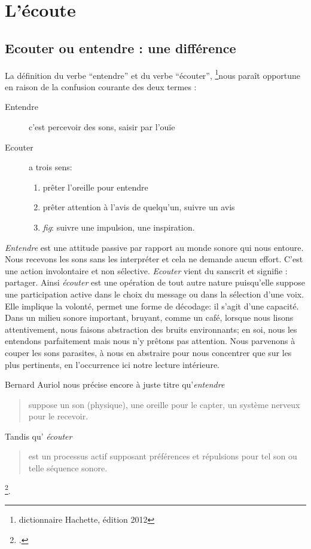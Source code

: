 \chapter{L'écoute}

\section{Ecouter ou entendre : une différence}

La définition du verbe ``entendre'' et du verbe ``écouter'', 
\footnote{dictionnaire Hachette, édition 2012 }nous paraît opportune %
en raison de la confusion courante des deux termes :
\begin{description}
\item[Entendre] c'est  percevoir des sons, saisir par l'ouïe
\item[Ecouter] a trois sens: 
\begin{enumerate}
	\item prêter l'oreille pour entendre
	\item prêter attention
	à l'avis de quelqu'un, suivre un avis
	\item \emph{fig}: suivre une impulsion,
	une inspiration.
\end{enumerate}
\end{description}



\emph{Entendre} est une attitude passive par rapport au monde sonore
qui nous entoure. Nous recevons les sons sans les interpréter et cela
ne demande aucun effort. C'est une action involontaire et non
sélective.
\textit{Ecouter} vient du sanscrit et signifie : partager.
Ainsi \emph{écouter} est une opération de tout autre nature
puisqu'elle suppose une participation active dans le choix du message
ou dans la sélection d'une voix. Elle  implique la volonté,
permet une forme de décodage: il s'agit d'une capacité. Dans un milieu sonore important, bruyant, comme un café, lorsque nous lisons attentivement, nous faisons abstraction
des bruits environnants; en soi, nous les entendons parfaitement mais nous n'y
prêtons pas attention. Nous parvenons à couper les sons parasites, à nous en abstraire pour
nous concentrer que sur les plus  pertinents, en l'occurrence ici  notre lecture intérieure.




Bernard Auriol nous précise encore à juste titre qu'\textit{entendre} \begin{quote}
	suppose un son (physique), une oreille
pour le capter, un système nerveux pour le recevoir.
\end{quote} Tandis qu' \textit{écouter }\begin{quote}
est un
processus actif supposant préférences et répulsions pour tel son ou
telle séquence sonore.
\end{quote}\footnote{\cite{Auri96:clesons}.}.
 
